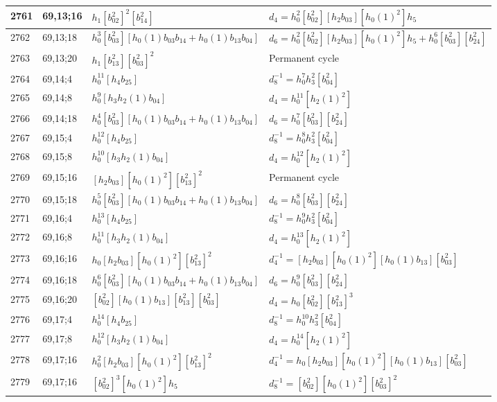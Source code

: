 \documentclass{article}
\begin{document}
\begin{longtable}{|l|l|>{\raggedright\arraybackslash}p{6cm}|>{\raggedright\arraybackslash}p{6cm}|}
\hline
2761 & 69,13;16 & $h_1[b_{02}^2]^2[b_{14}^2]$ &$d_{4}=h_0^2[b_{02}^2][h_2b_{03}][h_0(1)^2]h_5$\\
\hline
2762 & 69,13;18 & $h_0^3[b_{03}^2][h_0(1)b_{03}b_{14} + h_0(1)b_{13}b_{04}]$ &$d_{6}=h_0^2[b_{02}^2][h_2b_{03}][h_0(1)^2]h_5 + h_0^6[b_{03}^2][b_{24}^2]$\\
\hline
2763 & 69,13;20 & $h_1[b_{13}^2][b_{03}^2]^2$ & Permanent cycle\\
\hline
2764 & 69,14;4 & $h_0^{11}[h_4b_{25}]$ & $d_{8}^{-1}=h_0^7h_3^2[b_{04}^2]$\\
\hline
2765 & 69,14;8 & $h_0^9[h_3h_2(1)b_{04}]$ &$d_{4}=h_0^{11}[h_2(1)^2]$\\
\hline
2766 & 69,14;18 & $h_0^4[b_{03}^2][h_0(1)b_{03}b_{14} + h_0(1)b_{13}b_{04}]$ &$d_{6}=h_0^7[b_{03}^2][b_{24}^2]$\\
\hline
2767 & 69,15;4 & $h_0^{12}[h_4b_{25}]$ & $d_{8}^{-1}=h_0^8h_3^2[b_{04}^2]$\\
\hline
2768 & 69,15;8 & $h_0^{10}[h_3h_2(1)b_{04}]$ &$d_{4}=h_0^{12}[h_2(1)^2]$\\
\hline
2769 & 69,15;16 & $[h_2b_{03}][h_0(1)^2][b_{13}^2]^2$ & Permanent cycle\\
\hline
2770 & 69,15;18 & $h_0^5[b_{03}^2][h_0(1)b_{03}b_{14} + h_0(1)b_{13}b_{04}]$ &$d_{6}=h_0^8[b_{03}^2][b_{24}^2]$\\
\hline
2771 & 69,16;4 & $h_0^{13}[h_4b_{25}]$ & $d_{8}^{-1}=h_0^9h_3^2[b_{04}^2]$\\
\hline
2772 & 69,16;8 & $h_0^{11}[h_3h_2(1)b_{04}]$ &$d_{4}=h_0^{13}[h_2(1)^2]$\\
\hline
2773 & 69,16;16 & $h_0[h_2b_{03}][h_0(1)^2][b_{13}^2]^2$ & $d_{4}^{-1}=[h_2b_{03}][h_0(1)^2][h_0(1)b_{13}][b_{03}^2]$\\
\hline
2774 & 69,16;18 & $h_0^6[b_{03}^2][h_0(1)b_{03}b_{14} + h_0(1)b_{13}b_{04}]$ &$d_{6}=h_0^9[b_{03}^2][b_{24}^2]$\\
\hline
2775 & 69,16;20 & $[b_{02}^2][h_0(1)b_{13}][b_{13}^2][b_{03}^2]$ &$d_{4}=h_0[b_{02}^2][b_{13}^2]^3$\\
\hline
2776 & 69,17;4 & $h_0^{14}[h_4b_{25}]$ & $d_{8}^{-1}=h_0^{10}h_3^2[b_{04}^2]$\\
\hline
2777 & 69,17;8 & $h_0^{12}[h_3h_2(1)b_{04}]$ &$d_{4}=h_0^{14}[h_2(1)^2]$\\
\hline
2778 & 69,17;16 & $h_0^2[h_2b_{03}][h_0(1)^2][b_{13}^2]^2$ & $d_{4}^{-1}=h_0[h_2b_{03}][h_0(1)^2][h_0(1)b_{13}][b_{03}^2]$\\
2779 & 69,17;16 & $[b_{02}^2]^3[h_0(1)^2]h_5$ & $d_{8}^{-1}=[b_{02}^2][h_0(1)^2][b_{03}^2]^2$\\

\end{longtable}
\end{document}
